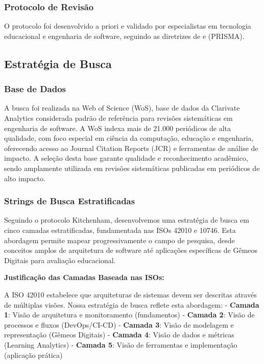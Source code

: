\documentclass[english, spanish, brazilian]{RBIEarticle} %
\begin{document}
\subsubsection{Protocolo de Revisão}

O protocolo foi desenvolvido a priori e validado por especialistas em tecnologia educacional e engenharia de software, seguindo as diretrizes de \textcite{Kitchenham2007} e \textcite{Page2021} (PRISMA).

\subsection{Estratégia de Busca}

\subsubsection{Base de Dados}

A busca foi realizada na Web of Science (WoS), base de dados da Clarivate Analytics considerada padrão de referência para revisões sistemáticas em engenharia de software. A WoS indexa mais de 21.000 periódicos de alta qualidade, com foco especial em ciência da computação, educação e engenharia, oferecendo acesso ao Journal Citation Reports (JCR) e ferramentas de análise de impacto. A seleção desta base garante qualidade e reconhecimento acadêmico, sendo amplamente utilizada em revisões sistemáticas publicadas em periódicos de alto impacto.

\subsubsection{Strings de Busca Estratificadas}

Seguindo o protocolo Kitchenham, desenvolvemos uma estratégia de busca em cinco camadas estratificadas, fundamentada nas ISOs 42010 e 10746. Esta abordagem permite mapear progressivamente o campo de pesquisa, desde conceitos amplos de arquitetura de software até aplicações específicas de Gêmeos Digitais para avaliação educacional.

\textbf{Justificação das Camadas Baseada nas ISOs:}

A ISO 42010 estabelece que arquiteturas de sistemas devem ser descritas através de múltiplas visões. Nossa estratégia de busca reflete esta abordagem:
- \textbf{Camada 1}: Visão de arquitetura e monitoramento (fundamentos)
- \textbf{Camada 2}: Visão de processos e fluxos (DevOps/CI-CD)
- \textbf{Camada 3}: Visão de modelagem e representação (Gêmeos Digitais)
- \textbf{Camada 4}: Visão de dados e métricas (Learning Analytics)
- \textbf{Camada 5}: Visão de ferramentas e implementação (aplicação prática)
\end{document}

